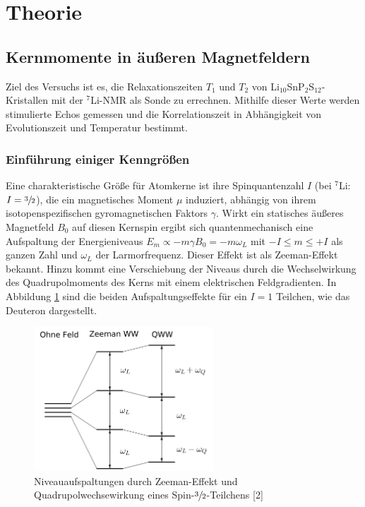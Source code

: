 \newpage					%



\setcounter{page}{1}
\section{Theorie}
\subsection{Kernmomente in äußeren Magnetfeldern}
Ziel des Versuchs ist es, die Relaxationszeiten $T_1$ und $T_2$ von Li$_{10}$SnP$_2$S$_{12}$-Kristallen mit der $^7$Li-NMR als Sonde zu errechnen. Mithilfe dieser Werte
werden stimulierte Echos gemessen und die Korrelationszeit in Abhängigkeit von Evolutionszeit und Temperatur bestimmt.

\subsubsection{Einführung einiger Kenngrößen}
Eine charakteristische Größe für Atomkerne ist ihre Spinquantenzahl $I$ (bei $^7$Li: $I = \sfrac32$), die ein magnetisches Moment $\mu$ induziert, abhängig von ihrem isotopenspezifischen
gyromagnetischen Faktors $\gamma$. Wirkt ein statisches äußeres Magnetfeld $B_0$ auf diesen Kernspin ergibt sich quantenmechanisch eine Aufspaltung der
Energieniveaus $E_m \propto - m \gamma B_0 = -m \omega_L $ mit $-I \leq m \leq +I$ als ganzen Zahl und $\omega_L$ der Larmorfrequenz. Dieser Effekt 
ist als Zeeman-Effekt bekannt. Hinzu kommt eine Verschiebung der Niveaus durch die Wechselwirkung des Quadrupolmoments des Kerns mit einem elektrischen 
Feldgradienten. In Abbildung \ref{pic_termschema} sind die beiden Aufspaltungseffekte für ein $I=1$ Teilchen, wie das Deuteron dargestellt.

\begin{figure}[H]
 \includegraphics[width=0.6\textwidth]{../pics/termschema.jpg}
 \caption{Niveauaufspaltungen durch Zeeman-Effekt und Quadrupolwechsewirkung eines Spin-$\sfrac32$-Teilchens [2]}
 \label{pic_termschema}
\end{figure}

